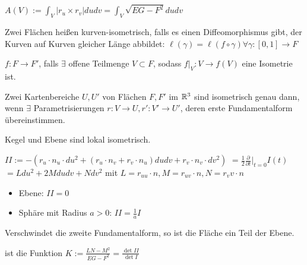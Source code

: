 \begin{bem}
    $A(V):=\int_V|r_u\times r_v|dudv = \int_V\sqrt{EG-F^2}dudv$
\end{bem}

\begin{defi}
    Zwei Flächen heißen kurven-isometrisch, falls es einen Diffeomorphismus gibt,
    der Kurven auf Kurven gleicher Länge abbildet: 
    $\ell(\gamma)=\ell(f\circ \gamma) \forall \gamma:[0,1]\to F$
\end{defi}

\begin{defi}
    $f:F\to F'$, falls $\exists$ offene Teilmenge $V\subset F$, sodass
    $f|_V:V\to f(V)$ eine Isometrie ist.
\end{defi}

\begin{satz}
    Zwei Kartenbereiche $U, U'$ von Flächen $F, F'$ im $\mathbb R^3$ sind isometrisch genau dann, wenn
    $\exists$ Parametrisierungen $r:V\to U, r':V'\to U'$, deren erste Fundamentalform übereinstimmen.
\end{satz}

\begin{bsp}
    Kegel und Ebene sind lokal isometrisch.
\end{bsp}

\begin{defi}
    $II:=-(r_u \cdot n_u \cdot du^2 + (r_u \cdot n_v + r_v \cdot n_u)dudv + r_v \cdot n_v \cdot dv^2)$
        $=\frac{1}{2}\frac{\partial}{\partial t}|_{t=0}I(t)$
        $=Ldu^2+2Mdudv+Ndv^2$
        mit $L=r_{uu}\cdot n, M=r_{uv}\cdot n, N=r_vv\cdot n$
\end{defi}

\begin{bsp}
    \begin{itemize}
        \item Ebene: $II=0$
        \item Sphäre mit Radius $a>0$: $II=\frac{1}{a}I$
    \end{itemize}
\end{bsp}

\begin{satz}
    Verschwindet die zweite Fundamentalform, so ist die Fläche ein Teil der Ebene.
\end{satz}

\begin{defi}
    ist die Funktion $K:=\frac{LN-M^2}{EG-F^2}=\frac{\det II}{\det I}$
\end{defi}

